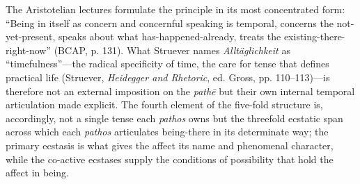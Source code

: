 \documentclass{article}
\begin{document}
The Aristotelian lectures formulate the principle in its most concentrated form: ``Being in itself as concern and concernful speaking is temporal, concerns the not-yet-present, speaks about what has-happened-already, treats the existing-there-right-now'' (BCAP, p. 131). What Struever names \textit{Alltäglichkeit} as ``timefulness''---the radical specificity of time, the care for tense that defines practical life (Struever, \textit{Heidegger and Rhetoric}, ed. Gross, pp. 110--113)---is therefore not an external imposition on the \textit{pathē} but their own internal temporal articulation made explicit. The fourth element of the five-fold structure is, accordingly, not a single tense each \textit{pathos} owns but the threefold ecstatic span across which each \textit{pathos} articulates being-there in its determinate way; the primary ecstasis is what gives the affect its name and phenomenal character, while the co-active ecstases supply the conditions of possibility that hold the affect in being.
\end{document}

